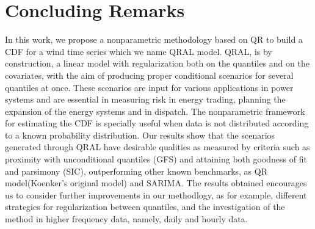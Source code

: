 \section{Concluding Remarks}

In this work, we propose a nonparametric methodology based on QR to build a CDF for a wind time series which we name QRAL model. QRAL, is by construction, a linear model with regularization both on the quantiles and on the covariates, with the aim of producing proper conditional scenarios for several quantiles at once. These scenarios are input for various applications in power systems and are essential in measuring risk in energy trading, planning the expansion of the energy systems and in dispatch. The nonparametric framework for estimating the CDF is specially useful when data is not distributed according to a known probability distribution. Our results show that the scenarios generated through QRAL have desirable qualities as measured by criteria such as proximity with unconditional quantiles (GFS) and attaining both goodness of fit and parsimony (SIC), outperforming other known benchmarks, as QR model(Koenker's original model) and SARIMA.  The results obtained encourages us to consider further improvements in our methodlogy, as for example, different strategies for regularization between quantiles, and the investigation of the method in higher frequency data, namely, daily and hourly data.

